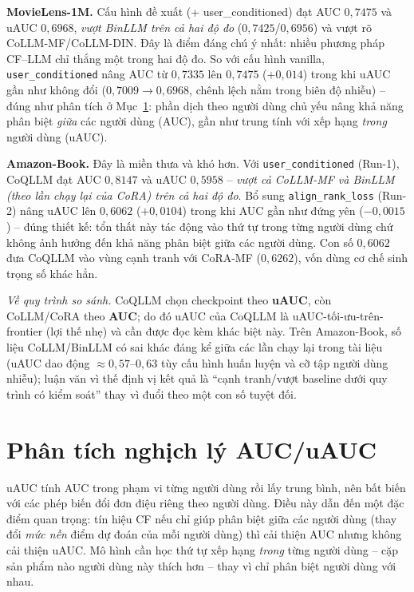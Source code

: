 \textbf{MovieLens-1M.} Cấu hình đề xuất (+ user\_conditioned) đạt AUC $0{,}7475$ và uAUC
$0{,}6968$, \textit{vượt BinLLM trên cả hai độ đo} ($0{,}7425$/$0{,}6956$) và vượt rõ
CoLLM-MF/CoLLM-DIN. Đây là điểm đáng chú ý nhất: nhiều phương pháp CF--LLM chỉ thắng một
trong hai độ đo. So với cấu hình vanilla, \texttt{user\_conditioned} nâng AUC từ $0{,}7335$
lên $0{,}7475$ ($+0{,}014$) trong khi uAUC gần như không đổi ($0{,}7009 \to 0{,}6968$, chênh
lệch nằm trong biên độ nhiễu) -- đúng như phân tích ở Mục~\ref{sec:nghich-ly}: phần dịch
theo người dùng chủ yếu nâng khả năng phân biệt \textit{giữa} các người dùng (AUC), gần như
trung tính với xếp hạng \textit{trong} người dùng (uAUC).

\textbf{Amazon-Book.} Đây là miền thưa và khó hơn. Với \texttt{user\_conditioned} (Run-1),
CoQLLM đạt AUC $0{,}8147$ và uAUC $0{,}5958$ -- \textit{vượt cả CoLLM-MF và BinLLM (theo lần
chạy lại của CoRA) trên cả hai độ đo}. Bổ sung \texttt{align\_rank\_loss} (Run-2) nâng uAUC
lên $0{,}6062$ ($+0{,}0104$) trong khi AUC gần như đứng yên ($-0{,}0015$) -- đúng thiết kế:
tổn thất này tác động vào thứ tự trong từng người dùng chứ không ảnh hưởng đến khả năng phân biệt
giữa các người dùng.
Con số $0{,}6062$ đưa CoQLLM vào vùng cạnh tranh với CoRA-MF ($0{,}6262$), vốn dùng cơ chế
sinh trọng số khác hẳn.

\textit{Về quy trình so sánh.} CoQLLM chọn checkpoint theo \textbf{uAUC}, còn
CoLLM/CoRA theo \textbf{AUC}; do đó uAUC của CoQLLM là uAUC-tối-ưu-trên-frontier (lợi thế
nhẹ) và cần được đọc kèm khác biệt này. Trên Amazon-Book, số liệu CoLLM/BinLLM có sai khác
đáng kể giữa các lần chạy lại trong tài liệu (uAUC dao động $\approx 0{,}57$--$0{,}63$ tùy
cấu hình huấn luyện và cỡ tập người dùng nhiễu); luận văn vì thế định vị kết quả là ``cạnh
tranh/vượt baseline dưới quy trình có kiểm soát'' thay vì đuổi theo một con số tuyệt đối.

\section{Phân tích nghịch lý AUC/uAUC}
\label{sec:nghich-ly}

uAUC tính AUC trong phạm vi từng người dùng rồi lấy trung bình, nên bất biến với các
phép biến đổi đơn điệu riêng theo người dùng. Điều này dẫn đến một đặc điểm quan trọng:
tín hiệu CF nếu chỉ giúp phân biệt giữa các người dùng (thay đổi \textit{mức nền} điểm
dự đoán của mỗi người dùng) thì cải thiện AUC nhưng không cải thiện uAUC. Mô hình cần
học thứ tự xếp hạng \textit{trong} từng người dùng -- cặp sản phẩm nào người dùng này
thích hơn -- thay vì chỉ phân biệt người dùng với nhau.

